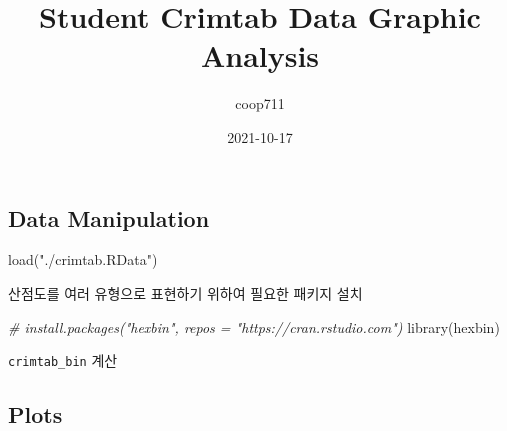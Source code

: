 \documentclass[
]{article}
\title{Student Crimtab Data Graphic Analysis}
\author{coop711}
\date{2021-10-17}
\newenvironment{Shaded}{\begin{snugshade}}{\end{snugshade}}
\newcommand{\AttributeTok}[1]{\textcolor[rgb]{0.77,0.63,0.00}{#1}}
\newcommand{\CommentTok}[1]{\textcolor[rgb]{0.56,0.35,0.01}{\textit{#1}}}
\newcommand{\DecValTok}[1]{\textcolor[rgb]{0.00,0.00,0.81}{#1}}
\newcommand{\FunctionTok}[1]{\textcolor[rgb]{0.00,0.00,0.00}{#1}}
\newcommand{\NormalTok}[1]{#1}
\newcommand{\OtherTok}[1]{\textcolor[rgb]{0.56,0.35,0.01}{#1}}
\newcommand{\SpecialCharTok}[1]{\textcolor[rgb]{0.00,0.00,0.00}{#1}}
\newcommand{\StringTok}[1]{\textcolor[rgb]{0.31,0.60,0.02}{#1}}
\begin{document}
\maketitle

\hypertarget{data-manipulation}{%
\subsection{Data Manipulation}\label{data-manipulation}}

\begin{Shaded}
\begin{Highlighting}[]
\FunctionTok{load}\NormalTok{(}\StringTok{"./crimtab.RData"}\NormalTok{)}
\end{Highlighting}
\end{Shaded}

산점도를 여러 유형으로 표현하기 위하여 필요한 패키지 설치

\begin{Shaded}
\begin{Highlighting}[]
\CommentTok{\# install.packages("hexbin", repos = "https://cran.rstudio.com")}
\FunctionTok{library}\NormalTok{(hexbin)}
\end{Highlighting}
\end{Shaded}

\texttt{crimtab\_bin} 계산

\begin{Shaded}
\end{Shaded}

\hypertarget{plots}{%
\subsection{Plots}\label{plots}}
\end{document}
